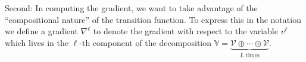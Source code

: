 \documentclass[10pt, a4paper]{article}
\theoremstyle{plain}
\theoremstyle{definition}
\theoremstyle{definition}
\theoremstyle{definition}
\theoremstyle{definition}
\theoremstyle{definition}
\theoremstyle{definition}
\theoremstyle{definition}
\theoremstyle{remark}
\theoremstyle{remark}
\theoremstyle{rudin-style-generic}
\theoremstyle{rudin-style-generic*}
\theoremstyle{rudin-style-theorem}
\newcommand{\deq}{\stackrel{\mathrm{def}}{=}}
\newcommand{\NN}{\mathbb N}
\newcommand{\RR}{\mathbb R}
\newcommand*{\boldcol}{{\,\boldsymbol{:}\,}}
\begin{document}
  
  Second: In computing the gradient, we want to take advantage of the ``compositional nature'' of the transition function.
  To express this in the notation we define a gradient $\nabla^\ell$ to denote the gradient with respect to the variable
  $v^\ell$ which lives in the $\ell$-th component of the decomposition
  $\mathbb V=\underbrace{\mathcal V\oplus\cdots\oplus\mathcal V}_{L\text{ times}}$.

    
\end{document}
